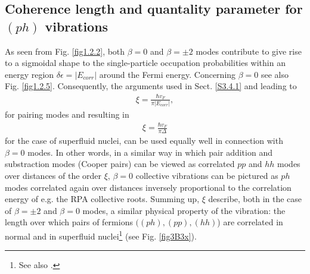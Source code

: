  \subsection{Coherence length and quantality parameter for $(ph)$ vibrations}\label{App4.B.2}
As seen from Fig. \ref{fig1.2.2}, both $\beta=0$ and $\beta=\pm2$ modes contribute to give rise to a sigmoidal shape to the single-particle occupation probabilities within an energy region $\delta\epsilon=|E_{corr}|$ around the Fermi energy. Concerning $\beta=0$ see also Fig. \ref{fig1.2.5}. Consequently, the arguments used in Sect. \ref{S3.4.1} and leading to 
\begin{align}\label{eq3.B.12}
 \xi=\frac{\hbar v_F}{\pi|E_{corr}|},
 \end{align}
 for pairing modes and resulting in
 \begin{align}
 \xi=\frac{\hbar v_F}{\pi\Delta}
 \end{align} 
 for the case of superfluid nuclei, can be used equally well in connection with $\beta=0$ modes. In other words, in a similar way in which pair addition and substraction modes (Cooper pairs) can be viewed as correlated $pp$ and $hh$ modes over distances of the order $\xi$, $\beta=0$ collective vibrations can be pictured as $ph$ modes correlated again over distances inversely proportional to the correlation energy of e.g. the RPA collective roots. Summing up, $\xi$ describe, both in the case of $\beta=\pm2$ and $\beta=0$ modes, a similar  physical property of the vibration: the  length over which  pairs of fermions $((ph),(pp),(hh)$)  are correlated in normal and in superfluid nuclei\footnote{See also \cite{Barranco:19b}.} (see Fig. \ref{fig3B3x}). 
